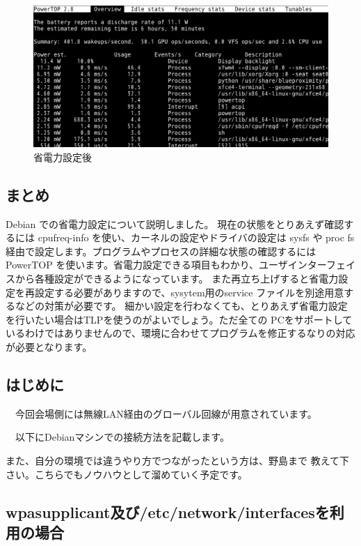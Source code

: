 \documentclass[mingoth,a4paper]{jsarticle}
\begin{document}
\begin{figure}[H]
\begin{center}
\includegraphics[width=0.5\hsize]{image201602/powertop_02.png}
\end{center}
\label{fig:powertop2}
\caption{省電力設定後} 
\end{figure}

\subsection{まとめ}

Debian での省電力設定について説明しました。
現在の状態をとりあえず確認するには cpufreq-info を使い、カーネルの設定やドライバの設定は
sysfs や proc fs 経由で設定します。プログラムやプロセスの詳細な状態の確認するには PowerTOP
を使います。省電力設定できる項目もわかり、ユーザインターフェイスから各種設定ができるようになっています。
また再立ち上げすると省電力設定を再設定する必要がありますので、sysytem用のservice
ファイルを別途用意するなどの対策が必要です。
細かい設定を行わなくても、とりあえず省電力設定を行いたい場合はTLPを使うのがよいでしょう。ただ全ての
PCをサポートしているわけではありませんので、環境に合わせてプログラムを修正するなりの対応が必要となります。

 \subsection{はじめに}

　今回会場側には無線LAN経由のグローバル回線が用意されています。

　以下にDebianマシンでの接続方法を記載します。

 また、自分の環境では違うやり方でつながったという方は、野島まで
教えて下さい。こちらでもノウハウとして溜めていく予定です。

 \subsection{wpasupplicant及び/etc/network/interfacesを利用の場合}
\end{document}
